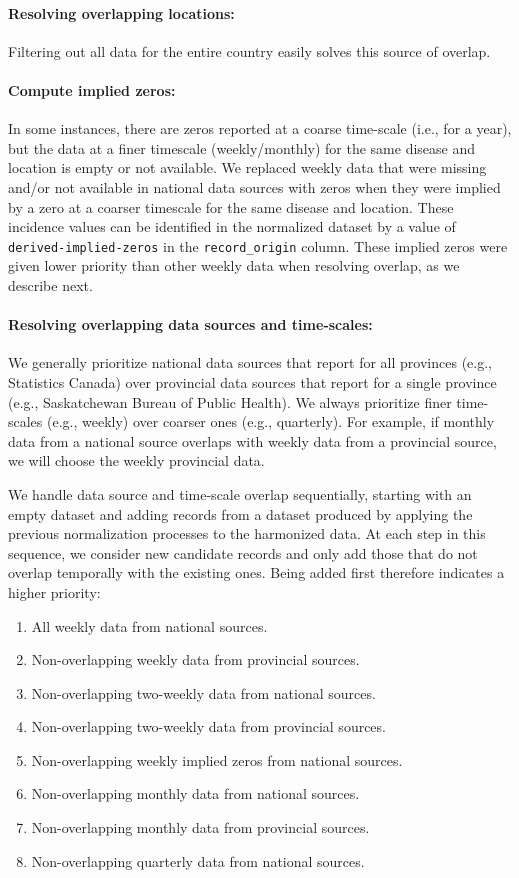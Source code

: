 \documentclass[12pt]{article}
\begin{document}
\paragraph{Resolving overlapping locations:} Filtering out all data for the entire country easily solves this source of overlap.

\paragraph{Compute implied zeros:} In some instances, there are zeros reported at a coarse time-scale (i.e., for a year), but the data at a finer timescale (weekly/monthly) for the same disease and location is empty or not available. We replaced weekly data that were missing and/or not available in national data sources with zeros when they were implied by a zero at a coarser timescale for the same disease and location. These incidence values can be identified in the normalized dataset by a value of \texttt{derived-implied-zeros} in the \texttt{record\_origin} column. These implied zeros were given lower priority than other weekly data when resolving overlap, as we describe next.

\paragraph{Resolving overlapping data sources and time-scales:} We generally prioritize national data sources that report for all provinces (e.g., Statistics Canada) over provincial data sources that report for a single province (e.g., Saskatchewan Bureau of Public Health). We always prioritize finer time-scales (e.g., weekly) over coarser ones (e.g., quarterly). For example, if monthly data from a national source overlaps with weekly data from a provincial source, we will choose the weekly provincial data.

We handle data source and time-scale overlap sequentially, starting with an empty dataset and adding records from a dataset produced by applying the previous normalization processes to the harmonized data. At each step in this sequence, we consider new candidate records and only add those that do not overlap temporally with the existing ones. Being added first therefore indicates a higher priority:
\begin{enumerate}
  \item All weekly data from national sources.
  \item Non-overlapping weekly data from provincial sources.
  \item Non-overlapping two-weekly data from national sources.
  \item Non-overlapping two-weekly data from provincial sources.
  \item Non-overlapping weekly implied zeros from national sources.
  \item Non-overlapping monthly data from national sources.
  \item Non-overlapping monthly data from provincial sources.
  \item Non-overlapping quarterly data from national sources.
\end{enumerate}
\end{document}
